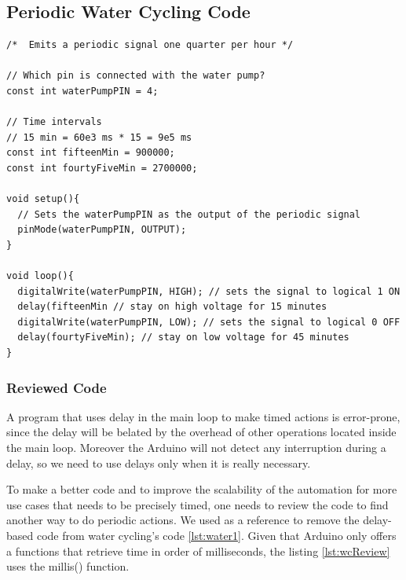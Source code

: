 \subsection{Periodic Water Cycling Code}


\begin{lstlisting}[style=Arduino, caption=Water Cycle First Code, label=lst:water1]
 /*  Emits a periodic signal one quarter per hour */

// Which pin is connected with the water pump?
const int waterPumpPIN = 4;

// Time intervals
// 15 min = 60e3 ms * 15 = 9e5 ms
const int fifteenMin = 900000;
const int fourtyFiveMin = 2700000;

void setup(){
  // Sets the waterPumpPIN as the output of the periodic signal
  pinMode(waterPumpPIN, OUTPUT);
}

void loop(){
  digitalWrite(waterPumpPIN, HIGH); // sets the signal to logical 1 ON
  delay(fifteenMin // stay on high voltage for 15 minutes
  digitalWrite(waterPumpPIN, LOW); // sets the signal to logical 0 OFF
  delay(fourtyFiveMin); // stay on low voltage for 45 minutes
}
\end{lstlisting}

\subsubsection{Reviewed Code}
A program that uses delay in the main loop to make timed actions is error-prone,
since the delay will be belated by the overhead of other operations located inside the main loop.
Moreover the Arduino will not detect any interruption during a delay,
so we need to use delays only when it is really necessary.

To make a better code and to improve the scalability of the automation for more use cases that needs to be precisely timed,
one needs to review the code to find another way to do periodic actions.
We used \cite{arduinoDelay} as a reference to remove the delay-based code from water cycling's code \ref{lst:water1}.
Given that Arduino only offers a functions that retrieve time in order of milliseconds,
the listing \ref{lst:wcReview} uses the millis() function.

